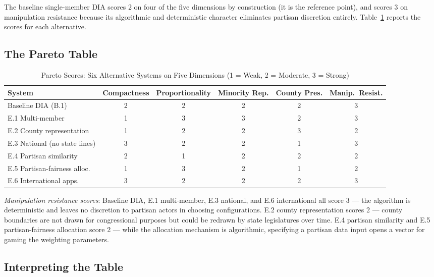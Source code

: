 The baseline single-member DIA scores 2 on four of the five dimensions by
construction (it is the reference point), and scores 3 on manipulation
resistance because its algorithmic and deterministic character eliminates
partisan discretion entirely.  Table~\ref{tab:pareto} reports the scores for
each alternative.

\subsection{The Pareto Table}

\begin{table}[ht]
\centering
\caption{Pareto Scores: Six Alternative Systems on Five Dimensions
         (1 = Weak, 2 = Moderate, 3 = Strong)}
\label{tab:pareto}
\begin{tabular}{lccccc}
\toprule
\textbf{System} & \textbf{Compactness} & \textbf{Proportionality}
  & \textbf{Minority Rep.} & \textbf{County Pres.}
  & \textbf{Manip.\ Resist.} \\
\midrule
Baseline DIA (B.1)          & 2 & 2 & 2 & 2 & 3 \\
\midrule
E.1 Multi-member            & 1 & 3 & 3 & 2 & 3 \\
E.2 County representation   & 1 & 2 & 2 & 3 & 2 \\
E.3 National (no state lines)& 3 & 2 & 2 & 1 & 3 \\
E.4 Partisan similarity     & 2 & 1 & 2 & 2 & 2 \\
E.5 Partisan-fairness alloc.& 1 & 3 & 2 & 1 & 2 \\
E.6 International apps.     & 3 & 2 & 2 & 2 & 3 \\
\bottomrule
\end{tabular}
\smallskip\par
\raggedright\small
\textit{Manipulation resistance scores}: Baseline DIA, E.1 multi-member,
E.3 national, and E.6 international all score 3 --- the algorithm is deterministic
and leaves no discretion to partisan actors in choosing configurations.
E.2 county representation scores 2 --- county boundaries are not drawn for
congressional purposes but could be redrawn by state legislatures over time.
E.4 partisan similarity and E.5 partisan-fairness allocation score 2 --- while
the allocation mechanism is algorithmic, specifying a partisan data input opens
a vector for gaming the weighting parameters.
\end{table}

\subsection{Interpreting the Table}

